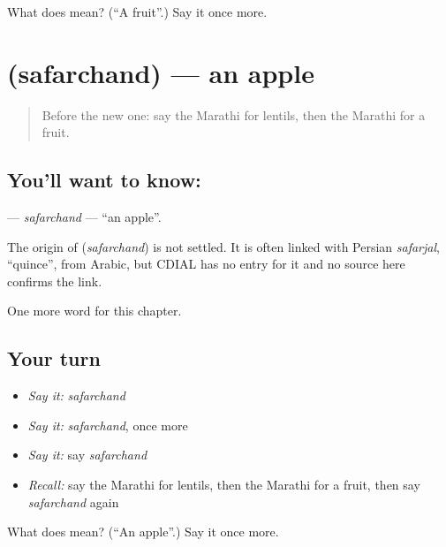 \begin{tcolorbox}[breakable,colback=teal!4,colframe=teal!35!black,title={Before you move on}]
What does  mean? (\textquotedblleft{}A fruit\textquotedblright{}.) Say it once more.
\end{tcolorbox}
\section[\texorpdfstring{\mr{सफरचंद} (safarchand)}{सफरचंद (safarchand)}]{ (safarchand) — an apple}

\label{lesson:MR-C85-safarchand}



\begin{quote}
Before the new one: say the Marathi for lentils, then the Marathi for a fruit.
\end{quote}

\subsection*{You'll want to know: }
\textbf{} — \emph{safarchand} — \textquotedblleft{}an apple\textquotedblright{}.

\begin{cousinweb}
The origin of \textbf{} (\emph{safarchand}) is not settled. It is often linked with Persian \emph{safarjal}, \textquotedblleft{}quince\textquotedblright{}, from Arabic, but CDIAL has no entry for it and no source here confirms the link.
\end{cousinweb}

\begin{grammarlens}[title={What you've built}]
One more word for this chapter.
\end{grammarlens}

\subsection*{Your turn}
\begin{itemize}
\raggedright
  \item \emph{Say it:} \emph{safarchand}
  \item \emph{Say it:} \emph{safarchand}, once more
  \item \emph{Say it:} say \emph{safarchand}
  \item \emph{Recall:} say the Marathi for lentils, then the Marathi for a fruit, then say \emph{safarchand} again
\end{itemize}

\begin{tcolorbox}[breakable,colback=teal!4,colframe=teal!35!black,title={Before you move on}]
What does  mean? (\textquotedblleft{}An apple\textquotedblright{}.) Say it once more.
\end{tcolorbox}
